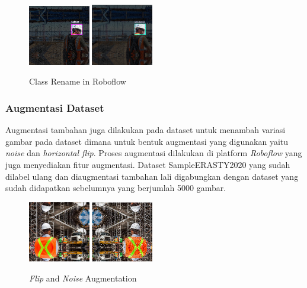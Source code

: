\begin{figure}[ht]
  \centering
  \includegraphics[width=0.24\textwidth]{gambar/utilities/reclass_old.png}
  \includegraphics[width=0.24\textwidth]{gambar/utilities/reclass_new.png}
  \caption{Class Rename in Roboflow}
  \label{fig:prepro_classrename}  
\end{figure}

\subsubsection{Augmentasi Dataset}
\label{subsec:augmentation}
\par Augmentasi tambahan juga dilakukan pada dataset untuk menambah variasi gambar pada dataset dimana untuk bentuk augmentasi yang digunakan yaitu \emph{noise} dan \emph{horizontal flip}. Proses augmentasi dilakukan di platform \emph{Roboflow} yang juga menyediakan fitur augmentasi. Dataset SampleERASTY2020 yang sudah dilabel ulang dan diaugmentasi tambahan lali digabungkan dengan dataset yang sudah didapatkan sebelumnya yang berjumlah 5000 gambar. 

\begin{figure}[ht]
  \centering
  \includegraphics[width=0.24\textwidth]{gambar/utilities/aug_flip.png}
  \includegraphics[width=0.24\textwidth]{gambar/utilities/aug_noise.png}
  \caption{\emph{Flip} and \emph{Noise} Augmentation}
  \label{fig:prepro_augmentasi}  
\end{figure}

